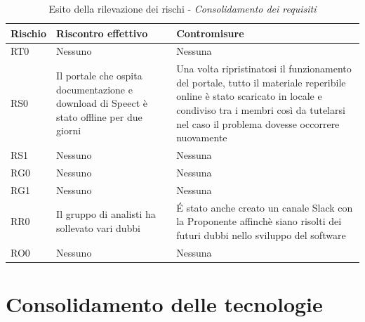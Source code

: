 \documentclass[./PianodiProgetto.tex]{subfiles}
\begin{document}
\begin{longtable}{|p{15mm}|p{60mm}|p{60mm}|}
	\caption{Esito della rilevazione dei rischi - \textit{Consolidamento dei requisiti}} \\
	\hline \textbf{Rischio} & \textbf{Riscontro effettivo} & \textbf{Contromisure} \\
	
	\hline RT0 & Nessuno & Nessuna \\
		
	\hline RS0 & Il portale che ospita documentazione e download di Speect è stato offline per due giorni & Una volta ripristinatosi il funzionamento del portale, tutto il materiale reperibile online è stato scaricato in locale e condiviso tra i membri così da tutelarsi nel caso il problema dovesse occorrere nuovamente \\
	
	\hline RS1 & Nessuno & Nessuna \\
	
	\hline RG0 & Nessuno & Nessuna \\
	
	\hline RG1 & Nessuno & Nessuna \\
	
	\hline RR0 & Il gruppo di analisti ha sollevato vari dubbi & \'E stato anche creato un canale Slack con la Proponente affinchè siano risolti dei futuri dubbi nello sviluppo del software \\
	
	\hline RO0 & Nessuno & Nessuna \\
	
	\hline
\end{longtable}

\section{Consolidamento delle tecnologie}

\setlength\LTleft{-5.5mm}
\end{document}
